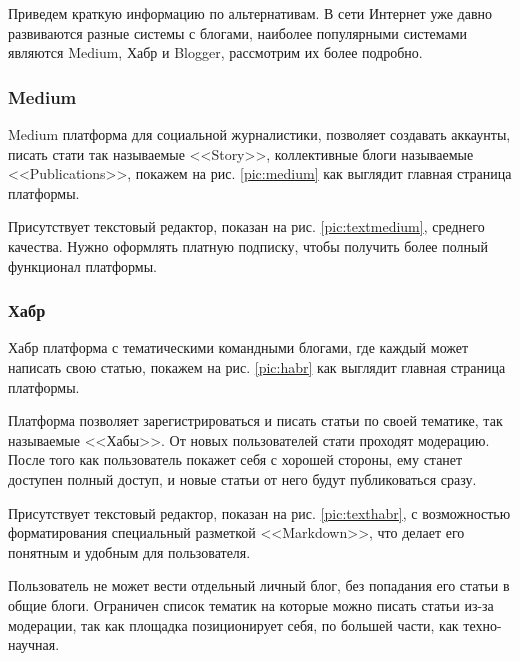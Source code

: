 Приведем краткую информацию по альтернативам. В сети Интернет уже давно развиваются разные системы с блогами, наиболее популярными системами являются Medium, Хабр и Blogger, рассмотрим их более подробно.

\pagebreak
\subsubsection{Medium}
Medium платформа для социальной журналистики, позволяет создавать аккаунты, писать стати так называемые <<Story>>, коллективные блоги называемые <<Publications>>, покажем на рис. \ref{pic:medium} как выглядит главная страница платформы.


Присутствует текстовый редактор, показан на рис. \ref{pic:textmedium}, среднего качества. Нужно оформлять платную подписку, чтобы получить более полный функционал платформы.


\subsubsection{Хабр}

Хабр платформа с тематическими командными блогами, где каждый может написать свою статью, покажем на рис. \ref{pic:habr} как выглядит главная страница платформы.


Платформа позволяет зарегистрироваться и писать статьи по своей тематике, так называемые <<Хабы>>. От новых пользователей стати проходят модерацию. После того как пользователь покажет себя с хорошей стороны, ему станет доступен полный доступ, и новые статьи от него будут публиковаться сразу.

\pagebreak

Присутствует текстовый редактор, показан на рис. \ref{pic:texthabr}, с возможностью форматирования специальный разметкой <<Markdown>>, что делает его понятным и удобным для пользователя.


Пользователь не может вести отдельный личный блог, без попадания его статьи в общие блоги. Ограничен список тематик на которые можно писать статьи из-за модерации, так как площадка позиционирует себя, по большей части, как техно-научная.


